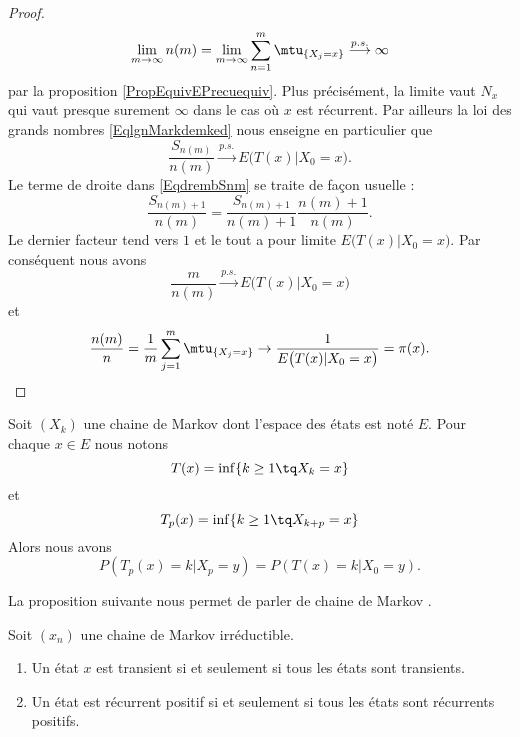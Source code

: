 \begin{proof}
\begin{equation}
		\lim_{m\to \infty}  n(m)=\lim_{m\to \infty} \sum_{n=1}^m\mtu_{\{ X_j=x \}}\stackrel{p.s.}{\longrightarrow}\infty
	\end{equation}
	par la proposition \eqref{PropEquivEPrecuequiv}. Plus précisément, la limite vaut \( N_x\) qui vaut presque surement \( \infty\) dans le cas où \( x\) est récurrent. Par ailleurs la loi des grands nombres \eqref{EqlgnMarkdemked} nous enseigne en particulier que
	\begin{equation}
		\frac{ S_{n(m)} }{ n(m) }\stackrel{p.s.}{\longrightarrow} E\big( T(x)|X_0=x \big).
	\end{equation}
	Le terme de droite dans \eqref{EqdrembSnm} se traite de façon usuelle :
	\begin{equation}
		\frac{ S_{n(m)+1} }{ n(m) }=\frac{ S_{n(m)+1} }{ n(m)+1 }\frac{ n(m)+1 }{ n(m) }.
	\end{equation}
	Le dernier facteur tend vers \( 1\) et le tout a pour limite \( E\big( T(x)|X_0=x \big)\). Par conséquent nous avons
	\begin{equation}
		\frac{ m }{ n(m) }\stackrel{p.s.}{\longrightarrow}E\big( T(x)|X_0=x \big)
	\end{equation}
	et
	\begin{equation}
		\frac{ n(m) }{ n }=\frac{1}{ m }\sum_{j=1}^m\mtu_{\{ X_j=x \}}\to\frac{1}{ E\big( T(x)|X_0=x \big) }=\pi(x).
	\end{equation}
\end{proof}

\begin{lemma}       \label{LembyftKs}
	Soit \( (X_k)\) une chaine de Markov dont l'espace des états est noté \( E\). Pour chaque \(  x\in E\) nous notons
	\begin{equation}
		T(x)=\inf\{ k\geq 1\tq X_k=x \}
	\end{equation}
	et
	\begin{equation}
		T_p(x)=\inf\{ k\geq 1\tq X_{k+p}=x \}
	\end{equation}
	Alors nous avons
	\begin{equation}
		P(T_p(x)=k|X_p=y)=P(T(x)=k|X_0=y).
	\end{equation}
\end{lemma}

La proposition suivante nous permet de parler de chaine de Markov .
\begin{proposition}     \label{PropUyLCzp}
	Soit \( (x_n)\) une chaine de Markov irréductible.
	\begin{enumerate}
		\item
		      Un état \( x\) est transient si et seulement si tous les états sont transients.
		\item
		      Un état est récurrent positif  si et seulement si tous les états sont récurrents positifs.
	\end{enumerate}
\end{proposition}


